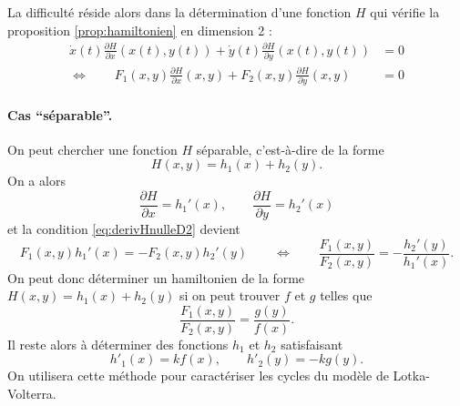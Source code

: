 La difficulté réside alors dans la détermination d'une fonction $H$ qui vérifie la proposition \ref{prop:hamiltonien} en dimension 2 : 
\begin{align} \label{eq:derivHnulleD2}
  \dot x(t) \frac{\partial H}{\partial x} (x(t), y(t)) +
  \dot y(t) \frac{\partial H}{\partial y} (x(t), y(t)) & = 0 \nonumber \\
  \Leftrightarrow \qquad 
  F_1(x, y) \frac{\partial H}{\partial x} (x, y) +
  F_2(x, y) \frac{\partial H}{\partial y} (x, y) & = 0
\end{align}

\paragraph*{Cas ``séparable''.} 
On peut chercher une fonction $H$ séparable, c'est-à-dire de la forme
$$
H(x, y) = h_1(x) + h_2(y).
$$
On a alors
$$
\frac{\partial H}{\partial x} = h_1'(x), \qquad
\frac{\partial H}{\partial y} = h_2'(x)
$$
et la condition \eqref{eq:derivHnulleD2} devient
$$
F_1(x, y) h_1'(x) = -F_2(x, y) h_2'(y)
\qquad \Leftrightarrow \qquad
\frac{F_1(x, y)}{F_2(x, y)} = -\frac{h_2'(y)}{h_1'(x)}.
$$
On peut donc déterminer un hamiltonien de la forme $H(x, y) = h_1(x) + h_2(y)$ si on peut trouver $f$ et $g$ telles que
$$
\frac{F_1(x, y)}{F_2(x, y)} = \frac{g(y)}{f(x)}.
$$
Il reste alors à déterminer des fonctions $h_1$ et $h_2$ satisfaisant
$$
h'_1(x) = k f(x), \qquad
h'_2(y) = - k g(y).
$$
On utilisera cette méthode pour caractériser les cycles du modèle de Lotka-Volterra.
